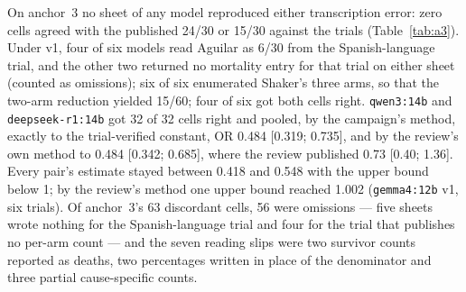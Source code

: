 \documentclass[11pt]{article}
\begin{document}
On anchor~3 no sheet of any model reproduced either transcription error: zero cells agreed with the published 24/30 or 15/30 against the trials (Table~\ref{tab:a3}). Under v1, four of six models read Aguilar as 6/30 from the Spanish-language trial, and the other two returned no mortality entry for that trial on either sheet (counted as omissions); six of six enumerated Shaker's three arms, so that the two-arm reduction yielded 15/60; four of six got both cells right. \texttt{qwen3:14b} and \texttt{deepseek-r1:14b} got 32 of 32 cells right and pooled, by the campaign's method, exactly to the trial-verified constant, OR 0.484 [0.319; 0.735], and by the review's own method to 0.484 [0.342; 0.685], where the review published 0.73 [0.40; 1.36]. Every pair's estimate stayed between 0.418 and 0.548 with the upper bound below 1; by the review's method one upper bound reached 1.002 (\texttt{gemma4:12b} v1, six trials). Of anchor~3's 63 discordant cells, 56 were omissions --- five sheets wrote nothing for the Spanish-language trial and four for the trial that publishes no per-arm count --- and the seven reading slips were two survivor counts reported as deaths, two percentages written in place of the denominator and three partial cause-specific counts.
\end{document}
